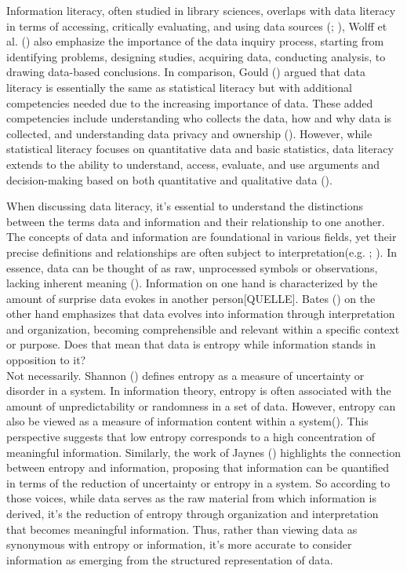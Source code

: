 \documentclass[
  12pt,
  a4paper,
  twoside]{article}
\begin{document}
Information literacy, often studied in library sciences, overlaps with data literacy in terms of accessing, critically evaluating, and using data sources (; ), Wolff et al. () also emphasize the importance of the data inquiry process, starting from identifying problems, designing studies, acquiring data, conducting analysis, to drawing data-based conclusions.
In comparison, Gould () argued that data literacy is essentially the same as statistical literacy but with additional competencies needed due to the increasing importance of data. These added competencies include understanding who collects the data, how and why data is collected, and understanding data privacy and ownership ().
However, while statistical literacy focuses on quantitative data and basic statistics, data literacy extends to the ability to understand, access, evaluate, and use arguments and decision-making based on both quantitative and qualitative data ().

When discussing data literacy, it's essential to understand the distinctions between the terms data and information and their relationship to one another.
The concepts of data and information are foundational in various fields, yet their precise definitions and relationships are often subject to interpretation(e.g. ; ). In essence, data can be thought of as raw, unprocessed symbols or observations, lacking inherent meaning (). Information on one hand is characterized by the amount of surprise data evokes in another person{[}QUELLE{]}. Bates () on the other hand emphasizes that data evolves into information through interpretation and organization, becoming comprehensible and relevant within a specific context or purpose. Does that mean that data is entropy while information stands in opposition to it?\\
Not necessarily. Shannon () defines entropy as a measure of uncertainty or disorder in a system. In information theory, entropy is often associated with the amount of unpredictability or randomness in a set of data. However, entropy can also be viewed as a measure of information content within a system(). This perspective suggests that low entropy corresponds to a high concentration of meaningful information. Similarly, the work of Jaynes () highlights the connection between entropy and information, proposing that information can be quantified in terms of the reduction of uncertainty or entropy in a system.
So according to those voices, while data serves as the raw material from which information is derived, it's the reduction of entropy through organization and interpretation that becomes meaningful information. Thus, rather than viewing data as synonymous with entropy or information, it's more accurate to consider information as emerging from the structured representation of data.
\end{document}

